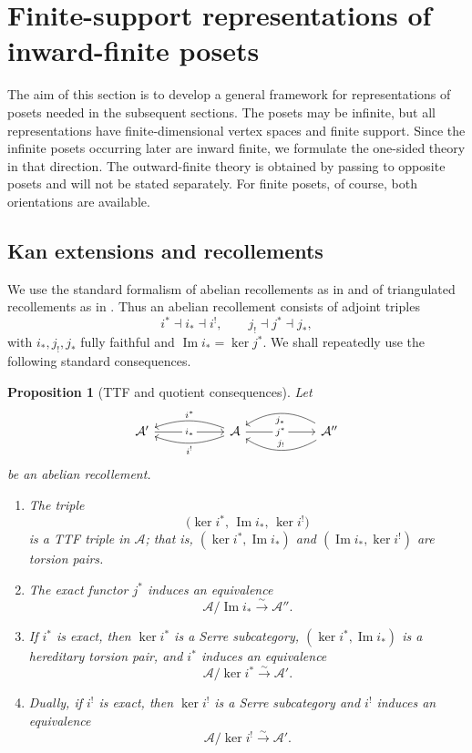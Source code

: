 \documentclass[10pt,a4paper]{amsart}
\newtheorem{proposition}[theorem]{Proposition}
\begin{document}
\section{Finite-support representations of inward-finite posets}
\label{sec:general-fs-theory}

The aim of this section is to develop a general framework for representations
of posets needed in the subsequent sections.  The posets may be infinite, but
all representations have finite-dimensional vertex spaces and finite support.
Since the infinite posets occurring later are inward finite, we formulate the
one-sided theory in that direction.  The outward-finite theory is obtained by
passing to opposite posets and will not be stated separately.  For finite
posets, of course, both orientations are available.

\subsection{Kan extensions and recollements}
\label{subsec:recollement-background}
We use the standard formalism of abelian recollements as in
\cite{FP,Psaroudakis,PV} and of triangulated recollements as in \cite{BBD}.
Thus an abelian recollement
consists of adjoint triples
\[
i^*\dashv i_*\dashv i^!,
\qquad
j_!\dashv j^*\dashv j_*,
\]
with $i_*,j_!,j_*$ fully faithful and $\operatorname{Im}i_*=\ker j^*$.
We shall repeatedly use the following standard consequences.

\begin{proposition}[TTF and quotient consequences]\label{prop:recollement-ttf}
Let
\[
\begin{tikzcd}[column sep=5.5em]
\mathcal A'
  \arrow[r, "i_*" description]
&
\mathcal A
  \arrow[l, bend right=20, "i^*"']
  \arrow[l, bend left=20, "i^!"]
  \arrow[r, "j^*" description]
&
\mathcal A''
  \arrow[l, bend left=32, "j_!"']
  \arrow[l, bend right=32, "j_*"]
\end{tikzcd}
\]
be an abelian recollement.
\begin{enumerate}[label=\rm(\arabic*)]
\item The triple
\[
\bigl(\ker i^*,\,\operatorname{Im}i_*,\,\ker i^!\bigr)
\]
is a TTF triple in $\mathcal A$; that is,
$(\ker i^*,\operatorname{Im}i_*)$ and
$(\operatorname{Im}i_*,\ker i^!)$ are torsion pairs.
\item The exact functor $j^*$ induces an equivalence
\[
\mathcal A/\operatorname{Im}i_*
\xrightarrow{\sim}
\mathcal A''.
\]
\item If $i^*$ is exact, then $\ker i^*$ is a Serre subcategory,
$(\ker i^*,\operatorname{Im}i_*)$ is a hereditary torsion pair, and
$i^*$ induces an equivalence
\[
\mathcal A/\ker i^*
\xrightarrow{\sim}
\mathcal A'.
\]
\item Dually, if $i^!$ is exact, then $\ker i^!$ is a Serre subcategory and
$i^!$ induces an equivalence
\[
\mathcal A/\ker i^!
\xrightarrow{\sim}
\mathcal A'.
\]
\end{enumerate}
\end{proposition}
\end{document}
